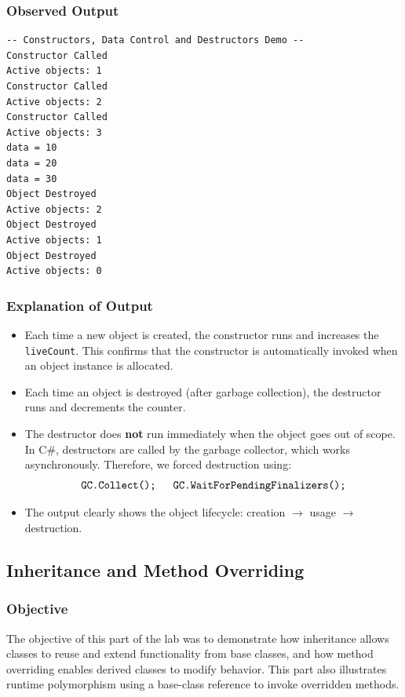 \subsubsection{Observed Output}
\begin{verbatim}
-- Constructors, Data Control and Destructors Demo --
Constructor Called
Active objects: 1
Constructor Called
Active objects: 2
Constructor Called
Active objects: 3
data = 10
data = 20
data = 30
Object Destroyed
Active objects: 2
Object Destroyed
Active objects: 1
Object Destroyed
Active objects: 0
\end{verbatim}

\subsubsection{Explanation of Output}
\begin{itemize}
    \item Each time a new object is created, the constructor runs and increases the \texttt{liveCount}. 
    This confirms that the constructor is automatically invoked when an object instance is allocated.
    \item Each time an object is destroyed (after garbage collection), the destructor runs and decrements the counter. 
    \item The destructor does \textbf{not} run immediately when the object goes out of scope. In C\#, 
    destructors are called by the garbage collector, which works asynchronously. Therefore, we forced destruction using:
    \[
    \texttt{GC.Collect(); \quad GC.WaitForPendingFinalizers();}
    \]
    \item The output clearly shows the object lifecycle: creation $\rightarrow$ usage $\rightarrow$ destruction.
\end{itemize}


\subsection{Inheritance and Method Overriding}

\subsubsection{Objective}
The objective of this part of the lab was to demonstrate how inheritance allows classes to reuse and extend functionality from base classes, and how method overriding enables derived classes to modify behavior. This part also illustrates runtime polymorphism using a base-class reference to invoke overridden methods.


